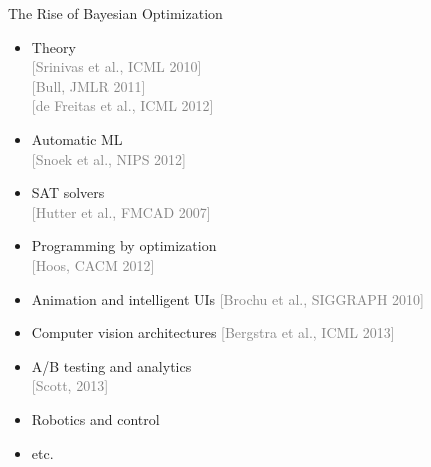 \documentclass[grey]{beamer}
\begin{document}
 \begin{frame}{The Rise of Bayesian Optimization}
 
 \begin{minipage}[l]{0.50\columnwidth}
     \begin{itemize}
   \footnotesize
    \item Theory \\
    \textcolor{gray}{[Srinivas et al., ICML 2010]} \\
    \textcolor{gray}{[Bull, JMLR 2011]} \\
    \textcolor{gray}{[de Freitas et al., ICML 2012]}
    \item Automatic ML  \\
    \textcolor{gray}{[Snoek et al., NIPS 2012]}
    \item SAT solvers \\
    \textcolor{gray}{[Hutter et al., FMCAD 2007]}
    \item Programming by optimization \\
    \textcolor{gray}{[Hoos, CACM 2012]}
   \item Animation and intelligent UIs \textcolor{gray}{[Brochu et al., SIGGRAPH 2010]}
   \item Computer vision architectures \textcolor{gray}{[Bergstra et al., ICML 2013]}
   \item A/B testing and analytics \\
   \textcolor{gray}{[Scott, 2013]}
   \item Robotics and control
   \item etc.
   \end{itemize}
    \end{minipage}
    \begin{minipage}[r]{0.48\columnwidth}
     \begin{figure}[t]
      

\end{figure}
\end{minipage}
\end{frame}
\end{document}
